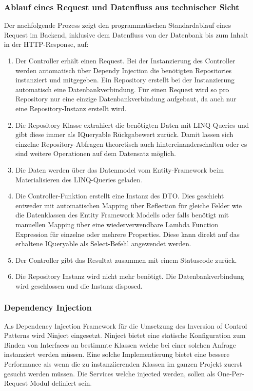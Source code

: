 \documentclass[a4paper,10pt,xetex]{article}
\begin{document}
\subsubsection{Ablauf eines Request und Datenfluss aus technischer Sicht}\label{ablauf-request}
Der nachfolgende Prozess zeigt den programmatischen Standardablauf eines Request im Backend, inklusive dem Datenfluss
von der Datenbank bis zum Inhalt in der HTTP-Response, auf:

\begin{enumerate}
  \item
    Der Controller erh\"alt einen Request. Bei der Instanzierung des Controller werden automatisch \"uber Dependy Injection
    die ben\"otigten Repositories instanziert und mitgegeben. Ein Repository erstellt bei der Instanzierung automatisch
    eine Datenbankverbindung. F\"ur einen Request wird so pro Repository nur eine einzige Datenbankverbindung aufgebaut, da
    auch nur eine Repository-Instanz erstellt wird.
  \item
    Die Repository Klasse extrahiert die ben\"otigten Daten mit LINQ-Queries und gibt diese immer als IQueryable
    R\"uckgabewert zur\"uck. Damit lassen sich einzelne Repository-Abfragen theoretisch auch hintereinanderschalten oder es
    sind weitere Operationen auf dem Datensatz m\"oglich.
  \item
    Die Daten werden \"uber das Datenmodel vom Entity-Framework beim Materialisieren des LINQ-Queries geladen.
  \item
    Die Controller-Funktion erstellt eine Instanz des DTO. Dies geschieht entweder mit automatischen Mapping \"uber
    Reflection f\"ur gleiche Felder wie die Datenklassen des Entity Framework Modells oder falls ben\"otigt mit manuellen
    Mapping \"uber eine wiederverwendbare Lambda Function Expression f\"ur einzelne oder mehrere Properties. Diese kann
    direkt auf das erhaltene IQueryable als Select-Befehl angewendet werden.
  \item
    Der Controller gibt das Resultat zusammen mit einem Statuscode zur\"uck.
  \item
    Die Repository Instanz wird nicht mehr ben\"otigt. Die Datenbankverbindung wird geschlossen und die Instanz disposed.
\end{enumerate}

\subsubsection{Dependency Injection}\label{dependency-injection}
Als Dependency Injection Framework f\"ur die Umsetzung des Inversion of Control Patterns wird Ninject eingesetzt.
Ninject bietet eine statische Konfiguration zum Binden von Interfaces an bestimmte Klassen welche bei einer solchen
Anfrage instanziert werden m\"ussen. Eine solche Implementierung bietet eine bessere Performance als wenn die zu
instanziierenden Klassen im ganzen Projekt zuerst gesucht werden m\"ussen. Die Services welche injected werden, sollen
als One-Per-Request Modul definiert sein.
\end{document}
